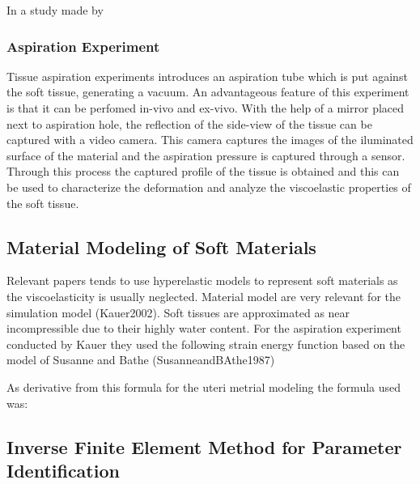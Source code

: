 In a study made by 

\subsubsection*{Aspiration Experiment}

Tissue aspiration experiments introduces an aspiration tube which is put against the 
soft tissue, generating a vacuum. An advantageous feature of this experiment is that 
it can be perfomed in-vivo and ex-vivo.
With the help of a mirror placed next to aspiration 
hole, the reflection of the side-view of the tissue can be captured with a video camera.
This camera captures the images of the iluminated surface of the material and the 
aspiration pressure is captured through a sensor. Through this process the captured 
profile of the tissue is obtained and this can be used to characterize the deformation 
and analyze the viscoelastic properties of the soft tissue\cite{Kauer2002}.



\subsection{Material Modeling of Soft Materials}
 
Relevant papers tends to use hyperelastic models to represent soft materials as the viscoelasticity 
is usually neglected. 
Material model are very relevant for the simulation model (Kauer2002).
Soft tissues are approximated as near incompressible due to their highly water content.  
For the aspiration experiment conducted by Kauer they used the following strain energy
function based on the model of Susanne and Bathe (SusanneandBAthe1987)


As derivative from this formula for the uteri metrial modeling the formula used was:

\subsection{Inverse Finite Element Method for Parameter Identification}

